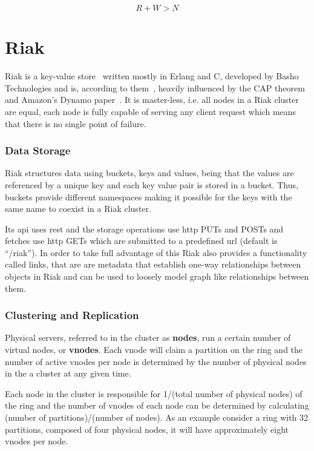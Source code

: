 \begin{equation}
	R + W > N
\label{eq:ineq}	
\end{equation}	

\section{Riak}

Riak is a key-value store~\cite{nosqlOrg} written mostly in Erlang and C, developed by Basho Technologies and is, according to them~\cite{riakWeb}, heavily influenced by the CAP theorem and Amazon's Dynamo paper~\cite{Hastorun2007}. It is master-less, i.e. all nodes in a Riak cluster are equal, each node is fully capable of serving any client request which means that there is no single point of failure. 

\subsubsection{Data Storage}

Riak structures data using buckets, keys and values, being that the values are referenced by a unique key and each key value pair is stored in a bucket. Thus, buckets provide different namespaces making it possible for the keys with the same name to coexist in a Riak cluster.

Its \ac{api} uses \ac{rest} and the storage operations use \ac{http} PUTs and POSTs and fetches use \ac{http} GETs which are submitted to a predefined \ac{url} (default is ``/riak''). In order to take full advantage of this Riak also provides a functionality called links, that are are metadata that establish one-way relationships between objects in Riak and can be used to loosely model graph like relationships between them.

\subsubsection{Clustering and Replication}

Physical servers, referred to in the cluster as \textbf{nodes}, run a certain number of virtual nodes, or \textbf{vnodes}. Each vnode will claim a partition on the ring and the number of active vnodes per node is determined by the number of physical nodes in the a cluster at any given time. 

Each node in the cluster is responsible for 1/(total number of physical nodes) of the ring and the number of vnodes of each node can be determined by calculating (number of partitions)/(number of nodes). As an example consider a ring with 32 partitions, composed of four physical nodes, it will have approximately eight vnodes per node.

